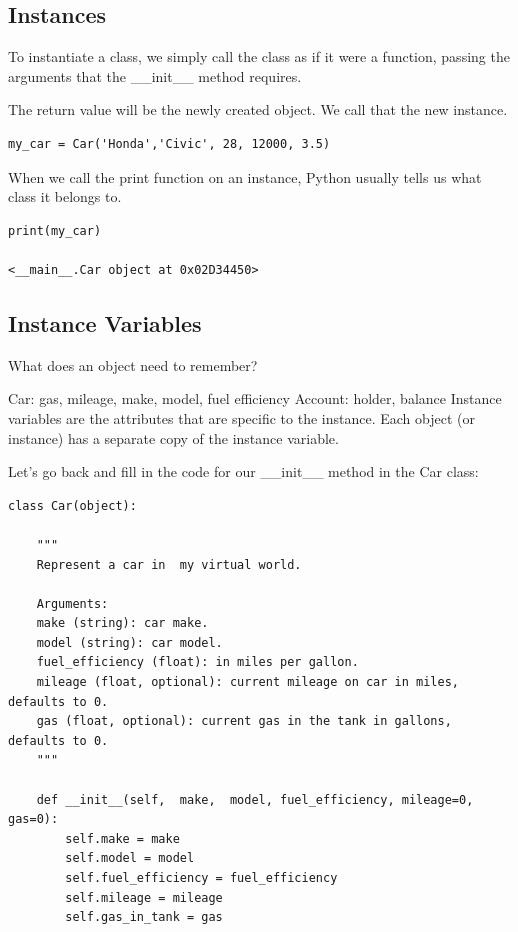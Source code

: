 \documentclass{article}
\begin{document}
\subsection{Instances}

To instantiate a class, we simply call the class as if it were a function, passing the arguments that the {\_}{\_}init{\_}{\_} method requires.

The return value will be the newly created object.  We call that the new instance.

\begin{lstlisting}
my_car = Car('Honda','Civic', 28, 12000, 3.5)
\end{lstlisting}

When we call the print function on an instance, Python usually tells us what class it belongs to.

\begin{lstlisting}
print(my_car)

<__main__.Car object at 0x02D34450>
\end{lstlisting}

\subsection{Instance Variables}

What does an object need to remember?

Car:  gas, mileage, make, model, fuel efficiency
Account: holder, balance
Instance variables are the attributes that are specific to the instance.  Each object (or instance) has a separate copy of the instance variable.

Let’s go back and fill in the code for our {\_}{\_}init{\_}{\_} method in the Car class:

\begin{lstlisting}
class Car(object):

    """
    Represent a car in  my virtual world.

    Arguments:
    make (string): car make.
    model (string): car model.
    fuel_efficiency (float): in miles per gallon.
    mileage (float, optional): current mileage on car in miles, defaults to 0.
    gas (float, optional): current gas in the tank in gallons, defaults to 0.
    """

    def __init__(self,  make,  model, fuel_efficiency, mileage=0, gas=0):
        self.make = make
        self.model = model
        self.fuel_efficiency = fuel_efficiency
        self.mileage = mileage
        self.gas_in_tank = gas
\end{lstlisting}
        
\end{document}
